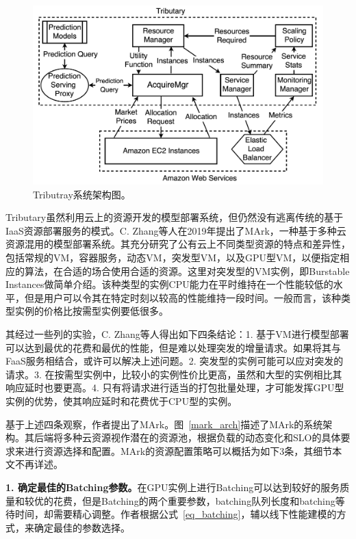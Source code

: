 \begin{figure}[h]
    \centerline{\includegraphics[width=\textwidth]{figures/tributary-arch.png}}
    \caption{Tributray系统架构图。}
    \label{tributary_arch}
\end{figure}

Tributary虽然利用云上的资源开发的模型部署系统，但仍然没有逃离传统的基于IaaS资源部署服务的模式。C. Zhang等人在2019年提出了MArk\parencite{zhang2019mark}，一种基于多种云资源混用的模型部署系统。其充分研究了公有云上不同类型资源的特点和差异性，包括常规的VM，容器服务，动态VM，突发型VM，以及GPU型VM，以便指定相应的算法，在合适的场合使用合适的资源。这里对突发型的VM实例，即Burstable Instances做简单介绍。该种类型的实例CPU能力在平时维持在一个性能较低的水平，但是用户可以令其在特定时刻以较高的性能维持一段时间。一般而言，该种类型实例的价格比按需型实例要低很多。

其经过一些列的实验，C. Zhang等人得出如下四条结论：1. 基于VM进行模型部署可以达到最优的花费和最优的性能，但是难以处理突发的增量请求。如果将其与FaaS服务相结合，或许可以解决上述问题。2. 突发型的实例可能可以应对突发的请求。3. 在按需型实例中，比较小的实例性价比更高，虽然和大型的实例相比其响应延时也要更高。4. 只有将请求进行适当的打包批量处理，才可能发挥GPU型实例的优势，使其响应延时和花费优于CPU型的实例。

基于上述四条观察，作者提出了MArk。图~\ref{mark_arch}描述了MArk的系统架构。其后端将多种云资源视作潜在的资源池，根据负载的动态变化和SLO的具体要求来进行资源选择和配置。MArk的资源配置策略可以概括为如下3条，其细节本文不再详述。

\textbf{1. 确定最佳的Batching参数。}在GPU实例上进行Batching可以达到较好的服务质量和较优的花费，但是Batching的两个重要参数，batching队列长度和batching等待时间，却需要精心调整。作者根据公式~\ref{eq_batching}，辅以线下性能建模的方式，来确定最佳的参数选择。

